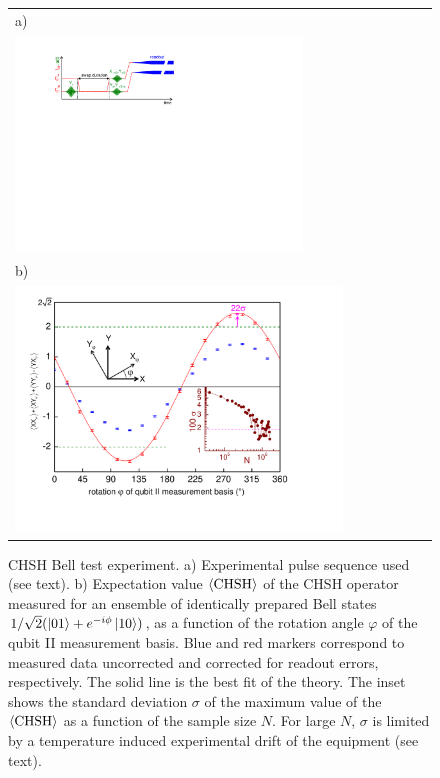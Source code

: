 \begin{figure}[p]
	\begin{tabular}{l}
	a) \\
		\hspace{0.7cm}\includegraphics[width=0.7\textwidth]{"./material/figures/measurement/chsh"} \\
	b) \\
		\includegraphics[width=0.8\textwidth]{./material/papers/iswap/figures/chsh}
	\end{tabular}
	\caption[]{ CHSH Bell test experiment. a) Experimental pulse sequence used (see text). b) Expectation value $\left< \mathrm{CHSH} \right>$ of the CHSH operator measured for an ensemble of identically prepared Bell states $1/\sqrt{2}(\left| 01 \right>+e^{-i\phi}\left| 10 \right>)$, as a function of the rotation angle $\varphi$ of the qubit II measurement basis. Blue and red markers correspond to measured data uncorrected and corrected for readout errors, respectively. The solid line is the best fit of the theory. The inset shows the standard deviation $\sigma$ of the maximum value of the $\left< \mathrm{CHSH} \right>$ as a function of the sample size $N$. For large $N$, $\sigma$ is limited by a temperature induced experimental drift of the equipment (see text).}
	\label{fig:chsh}
	\label{fig:chsh_pulse_sequence}
\end{figure}


